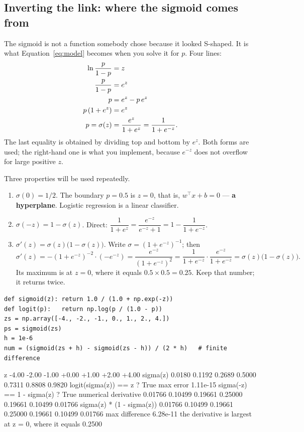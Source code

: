 \documentclass[11pt]{article}
\begin{document}
\subsection{Inverting the link: where the sigmoid comes from}
\label{sec:sigmoid}

The sigmoid is not a function somebody chose because it looked S-shaped. It is
what Equation~\eqref{eq:model} becomes when you solve it for $p$. Four lines:
\begin{align}
  \ln\frac{p}{1-p} &= z \notag\\
  \frac{p}{1-p} &= e^{z} \notag\\
  p &= e^{z} - p\,e^{z} \notag\\
  p\left(1 + e^{z}\right) &= e^{z} \notag\\
  p = \sigma(z) &= \frac{e^{z}}{1 + e^{z}} = \frac{1}{1 + e^{-z}} .
  \label{eq:sigmoid}
\end{align}
The last equality is obtained by dividing top and bottom by $e^{z}$. Both
forms are used; the right-hand one is what you implement, because
$e^{-z}$ does not overflow for large positive $z$.

Three properties will be used repeatedly.

\begin{enumerate}[leftmargin=*]
  \item $\sigma(0) = 1/2$. The boundary $p = 0.5$ is $z = 0$, that is,
    $w^{\!\top}x + b = 0$ --- \textbf{a hyperplane}. Logistic regression is a
    linear classifier.
  \item $\sigma(-z) = 1 - \sigma(z)$. Direct:
    $\dfrac{1}{1+e^{z}} = \dfrac{e^{-z}}{e^{-z}+1} = 1 - \dfrac{1}{1+e^{-z}}$.
  \item $\sigma'(z) = \sigma(z)\bigl(1 - \sigma(z)\bigr)$. Write
    $\sigma = (1+e^{-z})^{-1}$; then
    \[
      \sigma'(z) = -(1+e^{-z})^{-2}\cdot(-e^{-z})
                 = \frac{e^{-z}}{(1+e^{-z})^{2}}
                 = \frac{1}{1+e^{-z}}\cdot\frac{e^{-z}}{1+e^{-z}}
                 = \sigma(z)\bigl(1-\sigma(z)\bigr).
    \]
    Its maximum is at $z = 0$, where it equals $0.5 \times 0.5 = 0.25$. Keep
    that number; it returns twice.
\end{enumerate}

\begin{lstlisting}
def sigmoid(z): return 1.0 / (1.0 + np.exp(-z))
def logit(p):   return np.log(p / (1.0 - p))
zs = np.array([-4., -2., -1., 0., 1., 2., 4.])
ps = sigmoid(zs)
h = 1e-6
num = (sigmoid(zs + h) - sigmoid(zs - h)) / (2 * h)   # finite difference
\end{lstlisting}
\begin{codeout}
z         -4.00    -2.00    -1.00    +0.00    +1.00    +2.00    +4.00
sigma(z)  0.0180  0.1192  0.2689  0.5000  0.7311  0.8808  0.9820
logit(sigma(z)) == z ? True   max error 1.11e-15
sigma(-z) == 1 - sigma(z) ? True
numerical derivative       0.01766 0.10499 0.19661 0.25000 0.19661 0.10499 0.01766
sigma(z) * (1 - sigma(z))  0.01766 0.10499 0.19661 0.25000 0.19661 0.10499 0.01766
max difference 6.28e-11
the derivative is largest at z = 0, where it equals 0.2500
\end{codeout}
\end{document}
